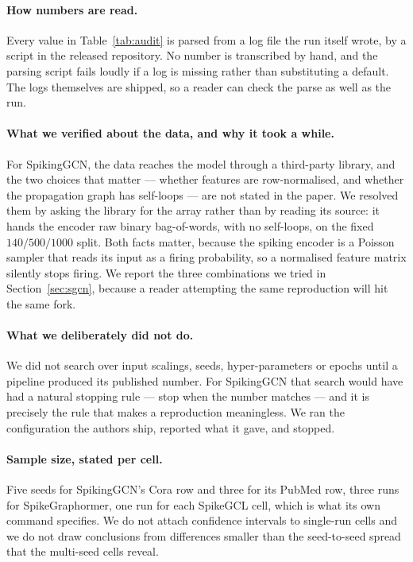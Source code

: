 \documentclass[10pt,twocolumn]{article}
\newcommand{\tabref}[1]{Table~\ref{#1}}
\newcommand{\secref}[1]{Section~\ref{#1}}
\begin{document}
\paragraph{How numbers are read.} Every value in \tabref{tab:audit} is parsed from a log file the run
itself wrote, by a script in the released repository. No number is transcribed by hand, and the
parsing script fails loudly if a log is missing rather than substituting a default. The logs
themselves are shipped, so a reader can check the parse as well as the run.

\paragraph{What we verified about the data, and why it took a while.} For SpikingGCN, the data reaches
the model through a third-party library, and the two choices that matter --- whether features are
row-normalised, and whether the propagation graph has self-loops --- are not stated in the paper. We
resolved them by asking the library for the array rather than by reading its source: it hands the
encoder raw binary bag-of-words, with no self-loops, on the fixed $140/500/1000$ split. Both facts
matter, because the spiking encoder is a Poisson sampler that reads its input as a firing probability,
so a normalised feature matrix silently stops firing. We report the three combinations we tried in
\secref{sec:sgcn}, because a reader attempting the same reproduction will hit the same fork.

\paragraph{What we deliberately did not do.} We did not search over input scalings, seeds,
hyper-parameters or epochs until a pipeline produced its published number. For SpikingGCN that search
would have had a natural stopping rule --- stop when the number matches --- and it is precisely the
rule that makes a reproduction meaningless. We ran the configuration the authors ship, reported what
it gave, and stopped.

\paragraph{Sample size, stated per cell.} Five seeds for SpikingGCN's Cora row and three for its PubMed row, three runs for
SpikeGraphormer,
one run for each SpikeGCL cell, which is what its own command specifies. We do not attach confidence
intervals to single-run cells and we do not draw conclusions from differences smaller than the
seed-to-seed spread that the multi-seed cells reveal.
\end{document}
